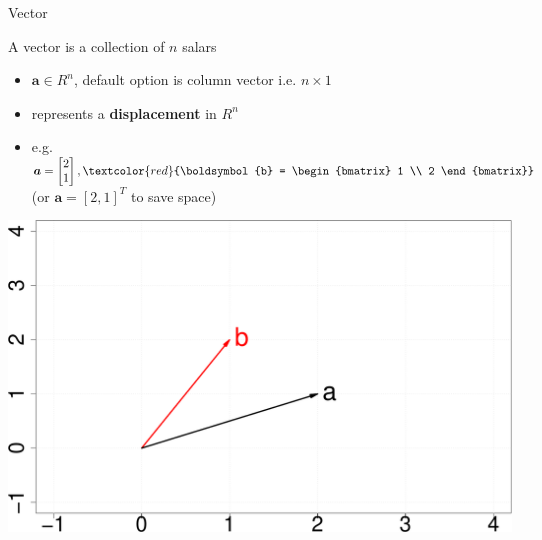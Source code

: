 \documentclass{scrartcl}
\def\tightlist{}
\newcommand{\vv}[1]{\boldsymbol{#1}}
\begin{document}
\begin{frame}{Vector}
\protect\hypertarget{vector}{}

A vector is a collection of \(n\) salars

\begin{itemize}
\tightlist
\item
  \(\vv{a} \in R^n\), default option is column vector i.e. \(n\times 1\)
\item
  represents a \textbf{displacement} in \(R^n\)
\item
  e.g.
  \(\vv{a} = \begin{bmatrix}  2 \\  1  \end{bmatrix}, \textcolor{red}{\vv{b} = \begin{bmatrix}  1 \\  2  \end{bmatrix}}\)
  (or \(\vv{a} = [2, 1]^T\) to save space) \bigskip   
\end{itemize}

\begin{center}\includegraphics[width=0.49\linewidth]{math4ml_files/figure-beamer/figures-side-1} \end{center}

\end{frame}
\end{document}
